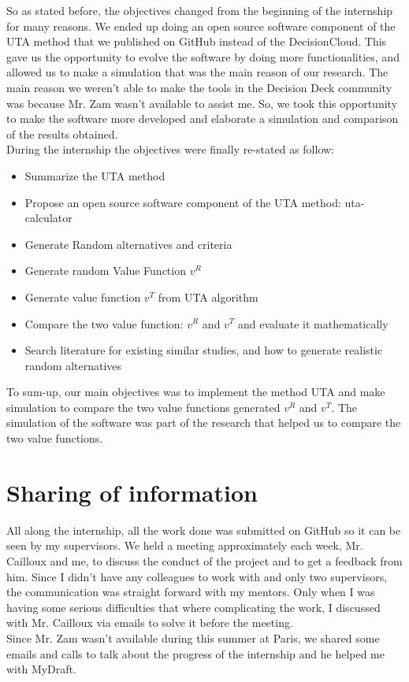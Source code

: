 \documentclass{report}
\begin{document}
So as stated before, the objectives changed from the beginning of the internship for many reasons. We ended up doing an open source software component of the UTA method that we published on GitHub instead of the DecisionCloud. This gave us the opportunity to evolve the software by doing more functionalities, and allowed us to make a simulation that was the main reason of our research. The main reason we weren't able to make the tools in the Decision Deck community was because Mr. Zam wasn't available to assist me. So, we took this opportunity to make the software more developed and elaborate a simulation and comparison of the results obtained.\\
During the internship the objectives were finally re-stated as follow: 
\begin{itemize}
\item Summarize the UTA method
\item Propose an open source software component of the UTA method: uta-calculator
\item Generate Random alternatives and criteria
\item Generate random Value Function $v^R$
\item Generate value function $v^T$ from UTA algorithm
\item Compare the two value function: $v^R$ and $v^T$  and evaluate it mathematically
\item Search literature for existing similar studies, and how to generate realistic random alternatives
\end{itemize}
To sum-up, our main objectives was to implement the method UTA and make simulation to compare the two value functions generated $v^R$ and $v^T$. The simulation of the software was part of the research that helped us to compare the two value functions.

\section{Sharing of information}
All along the internship, all the work done was submitted on GitHub so it can be seen by my supervisors. We held a meeting approximately each week, Mr. Cailloux and me, to discuss the conduct of the project and to get a feedback from him. Since I didn't have any colleagues to work with and only two supervisors, the communication was straight forward with my mentors. Only when I was having some serious difficulties that where complicating the work, I discussed with Mr. Cailloux via emails to solve it before the meeting. \\
Since Mr. Zam wasn't available during this summer at Paris, we shared some emails and calls to talk about the progress of the internship and he helped me with MyDraft. 
\end{document}
